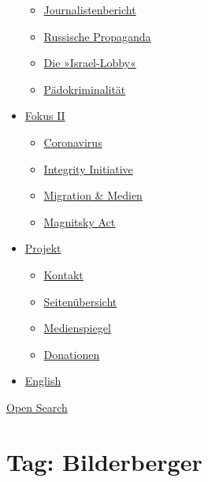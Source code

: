 \begin{itemize}
  \begin{itemize}
  \tightlist
  \item
    \href{https://swprs.org/bericht-eines-journalisten/}{Journalistenbericht}
  \item
    \href{https://swprs.org/russische-propaganda/}{Russische Propaganda}
  \item
    \href{https://swprs.org/die-israel-lobby-fakten-und-mythen/}{Die
    »Israel-Lobby«}
  \item
    \href{https://swprs.org/geopolitik-und-paedokriminalitaet/}{Pädokriminalität}
  \end{itemize}
\item
  \href{https://swprs.org/migration-und-medien/}{Fokus II}

  \begin{itemize}
  \tightlist
  \item
    \href{https://swprs.org/covid-19-hinweis-ii/}{Coronavirus}
  \item
    \href{https://swprs.org/die-integrity-initiative/}{Integrity
    Initiative}
  \item
    \href{https://swprs.org/migration-und-medien/}{Migration \& Medien}
  \item
    \href{https://swprs.org/der-fall-magnitsky/}{Magnitsky Act}
  \end{itemize}
\item
  \href{https://swprs.org/kontakt/}{Projekt}

  \begin{itemize}
  \tightlist
  \item
    \href{https://swprs.org/kontakt/}{Kontakt}
  \item
    \href{https://swprs.org/uebersicht/}{Seitenübersicht}
  \item
    \href{https://swprs.org/medienspiegel/}{Medienspiegel}
  \item
    \href{https://swprs.org/donationen/}{Donationen}
  \end{itemize}
\item
  \href{https://swprs.org/contact/}{English}
\end{itemize}

\protect\hyperlink{}{Open Search}

\hypertarget{tag-bilderberger}{%
\section{Tag: Bilderberger}\label{tag-bilderberger}}


